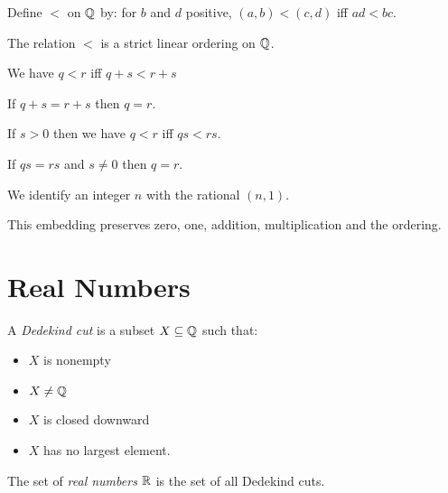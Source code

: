 \begin{definition}
    Define $<$ on $\mathbb{Q}$ by: for $b$ and $d$ positive, $(a,b) < (c,d)$ iff $ad < bc$.
\end{definition}

\begin{theorem}
    The relation $<$ is a strict linear ordering on $\mathbb{Q}$.
\end{theorem}

\begin{theorem}
    We have $q < r$ iff $q + s < r + s$
\end{theorem}

\begin{corollary}
    If $q + s = r + s$ then $q = r$.
\end{corollary}

\begin{theorem}
    If $s > 0$ then we have $q < r$ iff $qs < rs$.
\end{theorem}

\begin{corollary}
    If $qs = rs$ and $s \neq 0$ then $q = r$.
\end{corollary}

\begin{definition}
    We identify an integer $n$ with the rational $(n,1)$.
\end{definition}

\begin{theorem}
    This embedding preserves zero, one, addition, multiplication and the ordering.
\end{theorem}

\chapter{Real Numbers}

\begin{definition}
    A \emph{Dedekind cut} is a subset $X \subseteq \mathbb{Q}$ such that:
    \begin{itemize}
        \item $X$ is nonempty
        \item $X \neq \mathbb{Q}$
        \item $X$ is closed downward
        \item $X$ has no largest element.
    \end{itemize}
\end{definition}

\begin{definition}
    The set of \emph{real numbers} $\mathbb{R}$ is the set of all Dedekind cuts.
\end{definition}

